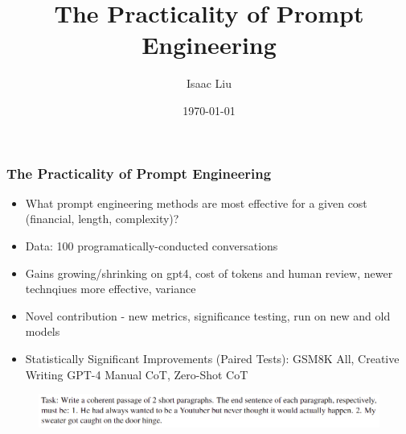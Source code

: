 \documentclass{beamer}
\title[The Practicality of Prompt Engineering]{The Practicality of Prompt Engineering}
\author{Isaac Liu}
\date{\today}
\begin{document}
    \begin{frame}
        \frametitle{The Practicality of Prompt Engineering}
        \begin{itemize}
            \item What prompt engineering methods are most effective for a given cost (financial, length, complexity)?
            \item Data: 100 programatically-conducted conversations
            \item Gains growing/shrinking on gpt4, cost of tokens and human review, newer technqiues more effective, variance
            \item Novel contribution - new metrics, significance testing, run on new and old models
            \item Statistically Significant Improvements (Paired Tests): GSM8K All, Creative Writing GPT-4 Manual CoT, Zero-Shot CoT
        \end{itemize}

        \begin{figure}[h]
            \centering
            \includegraphics[width=\hsize]{cw_example.png}
        \end{figure}

        \begin{figure}[h]


\end{figure}
\end{frame}
\end{document}

